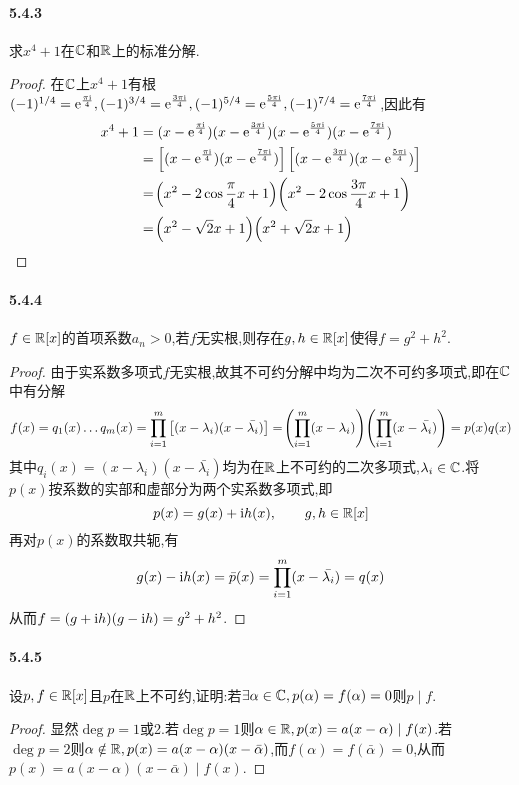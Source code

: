 \documentclass[11pt]{article}
\begin{document}
\paragraph{5.4.3}求$x^4+1$在$\mathbb{C}$和$\mathbb{R}$上的标准分解.
\begin{proof}
    在$\mathbb{C}$上$x^4+1$有根$(-1)^{1/4}=\mathrm{e}^{\frac{\pi\mathrm{i}}{4}}, (-1)^{3/4}=\mathrm{e}^{\frac{3\pi\mathrm{i}}{4}},(-1)^{5/4}=\mathrm{e}^{\frac{5\pi\mathrm{i}}{4}},(-1)^{7/4}=\mathrm{e}^{\frac{7\pi\mathrm{i}}{4}}$,因此有
    $$\begin{aligned}
        x^4+1&=(x-\mathrm{e}^{\frac{\pi\mathrm{i}}{4}})(x-\mathrm{e}^{\frac{3\pi\mathrm{i}}{4}})(x-\mathrm{e}^{\frac{5\pi\mathrm{i}}{4}})(x-\mathrm{e}^{\frac{7\pi\mathrm{i}}{4}})\\
        &=\left[(x-\mathrm{e}^{\frac{\pi\mathrm{i}}{4}})(x-\mathrm{e}^{\frac{7\pi\mathrm{i}}{4}})\right]\left[(x-\mathrm{e}^{\frac{3\pi\mathrm{i}}{4}})(x-\mathrm{e}^{\frac{5\pi\mathrm{i}}{4}})\right]\\
        &=\!\left(x^2-2\cos\frac{\pi}{4}x+1\right)\!\left(x^2-2\cos\frac{3\pi}{4}x+1\right)\\
        &=\!\left(x^2-\sqrt{2}x+1\right)\!\left(x^2+\sqrt{2}x+1\right)
    \end{aligned}$$
\end{proof}
\paragraph{5.4.4}$f\in \mathbb{R}[x]$的首项系数$a_n>0$,若$f$无实根,则存在$g,h\in \mathbb{R}[x]$使得$f=g^2+h^2$.
\begin{proof}
    由于实系数多项式$f$无实根,故其不可约分解中均为二次不可约多项式,即在$\mathbb{C}$中有分解
    $$f(x)=q_1(x)\dots q_m(x)=\prod_{i=1}^m \left[(x-\lambda_i)(x-\bar{\lambda_i})\right]=\!\left(\prod_{i=1}^m (x-\lambda_i)\right)\!\left(\prod_{i=1}^m (x-\bar{\lambda_i})\right)=p(x)q(x)$$
    其中$q_i(x)=(x-\lambda_i)(x-\bar{\lambda_i})$均为在$\mathbb{R}$上不可约的二次多项式,$\lambda_i\in\mathbb{C}$.将$p(x)$按系数的实部和虚部分为两个实系数多项式,即
    $$p(x)=g(x)+\mathrm{i} h(x), \qquad g,h\in \mathbb{R}[x]$$
    再对$p(x)$的系数取共轭,有
    $$g(x)-\mathrm{i} h(x)=\bar{p}(x)=\prod_{i=1}^m (x-\bar{\lambda_i})=q(x)$$
    从而$f=(g+\mathrm{i} h)(g-\mathrm{i} h)=g^2+h^2$.
\end{proof}
\paragraph{5.4.5}设$p,f\in \mathbb{R}[x]$且$p$在$\mathbb{R}$上不可约,证明:若$\exists\alpha\in\mathbb{C}, p(\alpha)=f(\alpha)=0$则$p\mid f$.
\begin{proof}
    显然$\deg p=1$或2.若$\deg p=1$则$\alpha\in\mathbb{R}, p(x)=a(x-\alpha)\mid f(x)$.若$\deg p=2$则$\alpha\notin\mathbb{R}, p(x)=a(x-\alpha)(x-\bar{\alpha})$,而$f(\alpha)=f(\bar{\alpha})=0$,从而$p(x)=a(x-\alpha)(x-\bar{\alpha})\mid f(x)$.
\end{proof}
\end{document}
